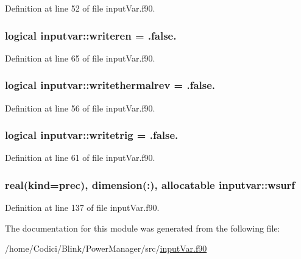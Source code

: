 Definition at line 52 of file input\-Var.\-f90.

\hypertarget{classinputvar_aaea9119ed7c4fbad274831007b696f46}{
\subsubsection[{writeren}]{\setlength{\rightskip}{0pt plus 5cm}logical inputvar\-::writeren = .false.}}\label{classinputvar_aaea9119ed7c4fbad274831007b696f46}


Definition at line 65 of file input\-Var.\-f90.

\hypertarget{classinputvar_ae7817d3a1abb7e02fdd1d3f40b45a4e8}{
\subsubsection[{writethermalrev}]{\setlength{\rightskip}{0pt plus 5cm}logical inputvar\-::writethermalrev = .false.}}\label{classinputvar_ae7817d3a1abb7e02fdd1d3f40b45a4e8}


Definition at line 56 of file input\-Var.\-f90.

\hypertarget{classinputvar_a676701049b4d18d378d94894b1fcae7b}{
\subsubsection[{writetrig}]{\setlength{\rightskip}{0pt plus 5cm}logical inputvar\-::writetrig = .false.}}\label{classinputvar_a676701049b4d18d378d94894b1fcae7b}


Definition at line 61 of file input\-Var.\-f90.

\hypertarget{classinputvar_a14476d610b1d64d08f3681482a8e82b8}{
\subsubsection[{wsurf}]{\setlength{\rightskip}{0pt plus 5cm}real(kind=prec), dimension(\-:), allocatable inputvar\-::wsurf}}\label{classinputvar_a14476d610b1d64d08f3681482a8e82b8}


Definition at line 137 of file input\-Var.\-f90.



The documentation for this module was generated from the following file\-:\begin{DoxyCompactItemize}
\item 
/home/\-Codici/\-Blink/\-Power\-Manager/src/\hyperlink{input_var_8f90}{input\-Var.\-f90}\end{DoxyCompactItemize}
